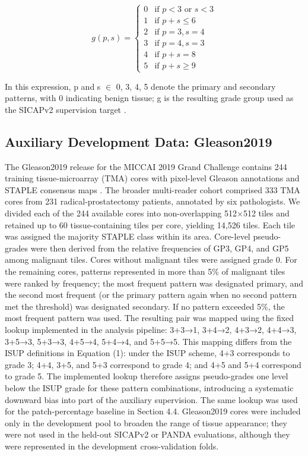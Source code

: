 \documentclass[11pt,a4paper]{article}
\begin{document}
\begin{equation}
g(p, s) = 
\begin{cases} 
0 & \text{if } p < 3 \text{ or } s < 3 \\
1 & \text{if } p + s \le 6 \\
2 & \text{if } p = 3, s = 4 \\
3 & \text{if } p = 4, s = 3 \\
4 & \text{if } p + s = 8 \\
5 & \text{if } p + s \ge 9 
\end{cases}
\label{eq:isup_mapping}
\end{equation}

In this expression, p and s $\in$ {0, 3, 4, 5} denote the primary and secondary patterns, with 0 indicating benign tissue; g is the resulting grade group used as the SICAPv2 supervision target \cite{ref2, ref3}.


\subsection{Auxiliary Development Data: Gleason2019}
The Gleason2019 release for the MICCAI 2019 Grand Challenge contains 244 training tissue-microarray (TMA) cores with pixel-level Gleason annotations and STAPLE consensus maps \cite{ref5}. The broader multi-reader cohort comprised 333 TMA cores from 231 radical-prostatectomy patients, annotated by six pathologists. We divided each of the 244 available cores into non-overlapping 512$\times$512 tiles and retained up to 60 tissue-containing tiles per core, yielding 14,526 tiles. Each tile was assigned the majority STAPLE class within its area. Core-level pseudo-grades were then derived from the relative frequencies of GP3, GP4, and GP5 among malignant tiles. Cores without malignant tiles were assigned grade 0. For the remaining cores, patterns represented in more than 5\% of malignant tiles were ranked by frequency; the most frequent pattern was designated primary, and the second most frequent (or the primary pattern again when no second pattern met the threshold) was designated secondary. If no pattern exceeded 5\%, the most frequent pattern was used. The resulting pair was mapped using the fixed lookup implemented in the analysis pipeline: 3+3→1, 3+4→2, 4+3→2, 4+4→3, 3+5→3, 5+3→3, 4+5→4, 5+4→4, and 5+5→5. This mapping differs from the ISUP definitions in Equation (1): under the ISUP scheme, 4+3 corresponds to grade 3; 4+4, 3+5, and 5+3 correspond to grade 4; and 4+5 and 5+4 correspond to grade 5. The implemented lookup therefore assigns pseudo-grades one level below the ISUP grade for these pattern combinations, introducing a systematic downward bias into part of the auxiliary supervision. The same lookup was used for the patch-percentage baseline in Section 4.4. Gleason2019 cores were included only in the development pool to broaden the range of tissue appearance; they were not used in the held-out SICAPv2 or PANDA evaluations, although they were represented in the development cross-validation folds.
\end{document}
